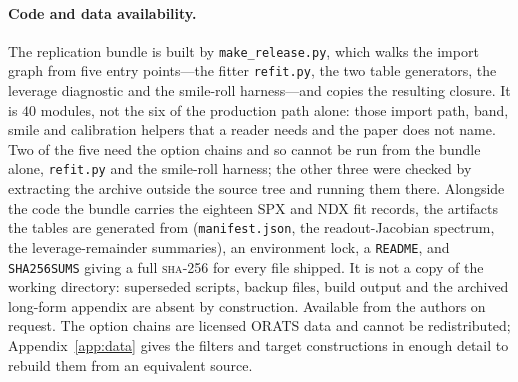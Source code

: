 \documentclass[11pt]{article}
\providecommand{\1}{\mathbf 1}
\begin{document}
\paragraph{Code and data availability.} The replication bundle is built by
\texttt{make\_release.py}, which walks the import graph from five entry points---the fitter
\texttt{refit.py}, the two table generators, the leverage diagnostic and the smile-roll
harness---and copies the resulting closure. It is $40$ modules, not the six of the production path
alone: those import path, band, smile and calibration helpers that a reader needs and the paper does
not name. Two of the five need the option chains and so cannot be run from the bundle alone,
\texttt{refit.py} and the smile-roll harness; the other three were checked by extracting the archive
outside the source tree and running them there. Alongside the code the bundle carries the eighteen
SPX and NDX fit records,
the artifacts the tables are generated from (\texttt{manifest.json}, the
readout-Jacobian spectrum, the leverage-remainder summaries), an environment lock, a
\texttt{README}, and \texttt{SHA256SUMS} giving a full \textsc{sha}-256 for every file shipped. It is
not a copy of the working directory: superseded scripts, backup files, build output and the archived
long-form appendix are absent by construction. Available from the authors on request. The option
chains are licensed ORATS data and cannot be redistributed; Appendix~\ref{app:data} gives the
filters and target constructions in enough detail to rebuild them from an equivalent source.

\begin{table}[htbp]
\centering{\footnotesize\setlength{\tabcolsep}{4pt}}
\caption{The \emph{principal} production configuration---the constants a reader must set to
reproduce the fits, not an exhaustive list of every literal in the path (the skew-difference step
$6\times10^{-3}$, the eight Newton iterations of the at-the-money inversion and the $60$-step VIX
bisection are fixed in the code and not exposed)---emitted by
\texttt{emit\_manifest.py}. The quadrature counts, the box, the clamps and the optimiser settings
are read from the objects the calibration constructs or parsed from the fitter's own source, so none
of them is transcribed.}
\label{tab:manifest}
\end{table}
\end{document}
